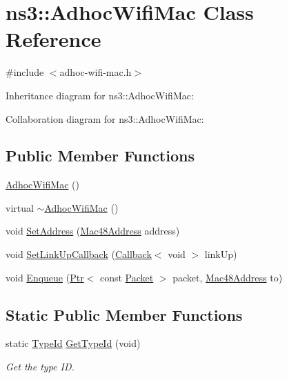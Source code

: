 \hypertarget{classns3_1_1AdhocWifiMac}{}\section{ns3\+:\+:Adhoc\+Wifi\+Mac Class Reference}
\label{classns3_1_1AdhocWifiMac}


{\ttfamily \#include $<$adhoc-\/wifi-\/mac.\+h$>$}



Inheritance diagram for ns3\+:\+:Adhoc\+Wifi\+Mac\+:


Collaboration diagram for ns3\+:\+:Adhoc\+Wifi\+Mac\+:
\subsection*{Public Member Functions}
\begin{DoxyCompactItemize}
\item 
\hyperlink{classns3_1_1AdhocWifiMac_a3f863c5a1bee28a2843dc9a832a9d45f}{Adhoc\+Wifi\+Mac} ()
\item 
virtual \hyperlink{classns3_1_1AdhocWifiMac_ad85c44728fc9d8d14245eb2bd68553f5}{$\sim$\+Adhoc\+Wifi\+Mac} ()
\item 
void \hyperlink{classns3_1_1AdhocWifiMac_ac25794fcd3862b3bbd0147705c7b0df8}{Set\+Address} (\hyperlink{classns3_1_1Mac48Address}{Mac48\+Address} address)
\item 
void \hyperlink{classns3_1_1AdhocWifiMac_a22a0b2919b8fab54e736a113cea2b2ea}{Set\+Link\+Up\+Callback} (\hyperlink{classns3_1_1Callback}{Callback}$<$ void $>$ link\+Up)
\item 
void \hyperlink{classns3_1_1AdhocWifiMac_a743d39d87f61965d34d41292b0650b87}{Enqueue} (\hyperlink{classns3_1_1Ptr}{Ptr}$<$ const \hyperlink{classns3_1_1Packet}{Packet} $>$ packet, \hyperlink{classns3_1_1Mac48Address}{Mac48\+Address} to)
\end{DoxyCompactItemize}
\subsection*{Static Public Member Functions}
\begin{DoxyCompactItemize}
\item 
static \hyperlink{classns3_1_1TypeId}{Type\+Id} \hyperlink{classns3_1_1AdhocWifiMac_ae6979b019458583eeafb0cb504e73f38}{Get\+Type\+Id} (void)
\begin{DoxyCompactList}\small\item\em Get the type ID. \end{DoxyCompactList}\end{DoxyCompactItemize}
